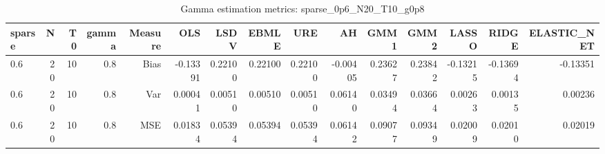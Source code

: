 \begin{table}[!htbp]\centering
\caption{Gamma estimation metrics: sparse_0p6_N20_T10_g0p8}
\label{tab:table1_sparse_0p6_N20_T10_g0p8}
\begin{tabular}{lrrrrrrrrrrrrrr}
\hline
sparse & N & T0 & gamma & Measure & OLS & LSDV & EBMLE & URE & AH & GMM1 & GMM2 & LASSO & RIDGE & ELASTIC_NET \\
\hline
0.6 & 20 & 10 & 0.8 & Bias & -0.13391 & 0.22100 & 0.22100 & 0.22100 & -0.00405 & 0.23627 & 0.23842 & -0.13215 & -0.13694 & -0.13351 \\
0.6 & 20 & 10 & 0.8 & Var & 0.00041 & 0.00510 & 0.00510 & 0.00510 & 0.06140 & 0.03494 & 0.03664 & 0.00263 & 0.00135 & 0.00236 \\
0.6 & 20 & 10 & 0.8 & MSE & 0.01834 & 0.05394 & 0.05394 & 0.05394 & 0.06142 & 0.09077 & 0.09349 & 0.02009 & 0.02010 & 0.02019 \\
\hline
\end{tabular}
\end{table}

